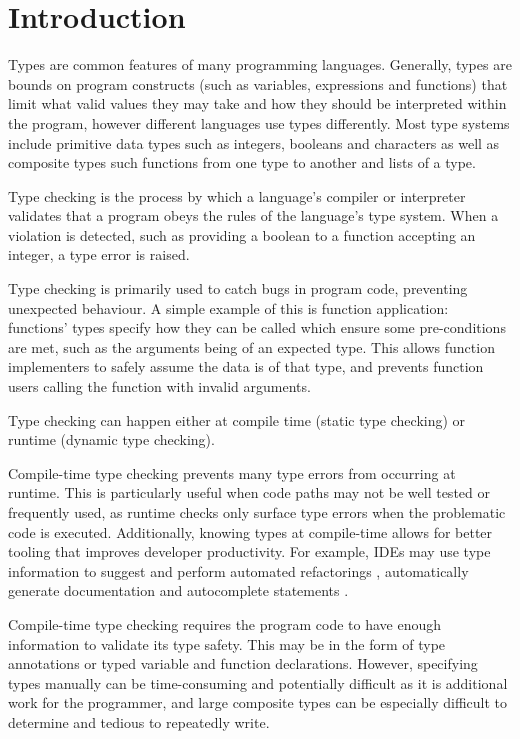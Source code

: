 \documentclass[a4paper,fleqn,twoside,12pt]{report}
\begin{document}
\chapter{Introduction}\label{id:h.6k9gcmunzldy}
Types are common features of many programming languages. Generally, types are bounds on program constructs (such as variables, expressions and functions) that limit what valid values they may take and how they should be interpreted within the program, however different languages use types differently. Most type systems include primitive data types such as integers, booleans and characters as well as composite types such functions from one type to another and lists of a type.

Type checking is the process by which a language’s compiler or interpreter validates that a program obeys the rules of the language’s type system. When a violation is detected, such as providing a boolean to a function accepting an integer, a type error is raised.

Type checking is primarily used to catch bugs in program code, preventing unexpected behaviour. A simple example of this is function application: functions’ types specify how they can be called which ensure some pre-conditions are met, such as the arguments being of an expected type. This allows function implementers to safely assume the data is of that type, and prevents function users calling the function with invalid arguments.

Type checking can happen either at compile time (static type checking) or runtime (dynamic type checking).

Compile-time type checking prevents many type errors from occurring at runtime. This is particularly useful when code paths may not be well tested or frequently used, as runtime checks only surface type errors when the problematic code is executed. Additionally, knowing types at compile-time allows for better tooling that improves developer productivity. For example, IDEs may use type information to suggest and perform automated refactorings \citep{ref1}, automatically generate documentation \citep{ref2} and autocomplete statements \citep{ref3}.

Compile-time type checking requires the program code to have enough information to validate its type safety. This may be in the form of type annotations or typed variable and function declarations. However, specifying types manually can be time-consuming and potentially difficult as it is additional work for the programmer, and large composite types can be especially difficult to determine and tedious to repeatedly write.
\end{document}
